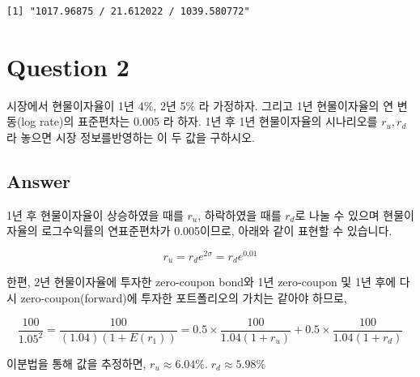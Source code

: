 \documentclass[
  letterpaper,
  DIV=11,
  numbers=noendperiod]{scrreprt}
\begin{document}
\begin{verbatim}
[1] "1017.96875 / 21.612022 / 1039.580772"
\end{verbatim}

\section*{Question 2}\label{question-2}


시장에서 현물이자율이 1년 4\%, 2년 5\% 라 가정하자. 그리고 1년
현물이자율의 연 변동(log rate)의 표준편차는 0.005 라 하자. 1년 후 1년
현물이자율의 시나리오를 \(r_u, r_d\) 라 놓으면 시장 정보를반영하는 이 두
값을 구하시오.

\subsection*{Answer}\label{answer-1}

1년 후 현물이자율이 상승하였을 때를 \(r_u\), 하락하였을 때를 \(r_d\)로
나눌 수 있으며 현물이자율의 로그수익률의 연표준편차가 0.005이므로,
아래와 같이 표현할 수 있습니다.

\[r_u=r_de^{2\sigma}=r_de^{0.01}\]

한편, 2년 현물이자율에 투자한 zero-coupon bond와 1년 zero-coupon 및 1년
후에 다시 zero-coupon(forward)에 투자한 포트폴리오의 가치는 같아야
하므로,

\[\frac{100}{1.05^2}=\frac{100}{(1.04)(1+E(r_1))}=0.5\times \frac{100}{1.04(1+r_u)}+0.5\times \frac{100}{1.04(1+r_d)}\]

이분법을 통해 값을 추정하면, \(r_u\approx 6.04\%.\;r_d\approx 5.98\%\)
\end{document}
